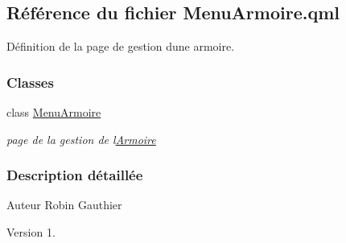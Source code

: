 \hypertarget{_menu_armoire_8qml}{}\subsection{Référence du fichier Menu\+Armoire.\+qml}
\label{_menu_armoire_8qml}


Définition de la page de gestion d\textquotesingle{}une armoire.  


\subsubsection*{Classes}
\begin{DoxyCompactItemize}
\item 
class \hyperlink{class_menu_armoire}{Menu\+Armoire}
\begin{DoxyCompactList}\small\item\em page de la gestion de l\textquotesingle{}\hyperlink{class_armoire}{Armoire} \end{DoxyCompactList}\end{DoxyCompactItemize}


\subsubsection{Description détaillée}
\begin{DoxyAuthor}{Auteur}
Robin Gauthier
\end{DoxyAuthor}
\begin{DoxyVersion}{Version}
1. 
\end{DoxyVersion}
